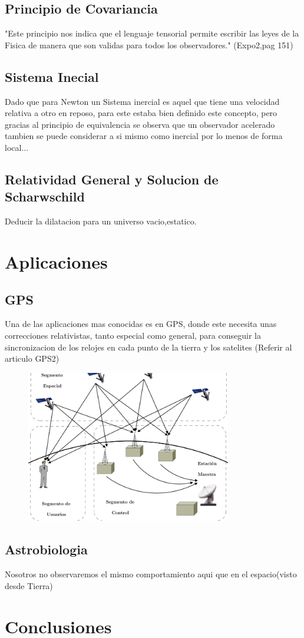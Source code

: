 \documentclass[12pt,twoside]{rif}
\begin{document}
	\subsection{Principio de Covariancia}
	"Este principio nos indica que el lenguaje tensorial permite escribir las leyes de la Fisica de manera que son validas para todos los observadores." (Expo2,pag 151)
	\subsection{Sistema Inecial}
	Dado que para Newton un Sistema inercial es aquel que tiene una velocidad relativa a otro en reposo, para este estaba bien definido este concepto, pero gracias al principio de equivalencia se observa que un observador acelerado tambien se puede considerar a si mismo como inercial por lo menos de forma local...
	\subsection{Relatividad General y Solucion de Scharwschild}
	Deducir la dilatacion para un universo vacio,estatico.
	
	\section{Aplicaciones}
	
	\subsection{GPS}
	Una de las aplicaciones mas conocidas es en GPS, donde este necesita unas correcciones relativistas, tanto especial como general, para conseguir la sincronizacion de los relojes en cada punto de la tierra y los satelites
	(Referir al articulo GPS2)
		\begin{center}
		\begin{figure}
		\includegraphics[width=0.8\textwidth]{img/GPS.png}
		\end{figure}
		\end{center}
	\subsection{Astrobiologia}
	Nosotros no observaremos el mismo comportamiento aqui que en  el espacio(visto desde Tierra)
	\section{Conclusiones}
	\nocite{*}
	
	
	
\end{document}
